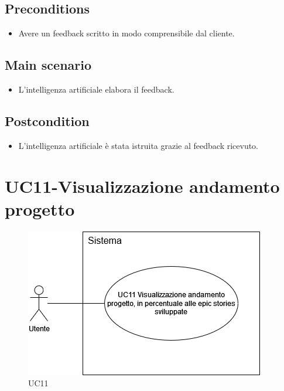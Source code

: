 \documentclass{article}
\begin{document}
     \subsection*{Preconditions} 
        \begin{itemize}
            \item Avere un feedback scritto in modo comprensibile dal cliente.
        \end{itemize}
        \subsection*{Main scenario}
        \begin{itemize}
            \item L'intelligenza artificiale elabora il feedback.
        \end{itemize}
        \subsection*{Postcondition} 
        \begin{itemize}
            \item L'intelligenza artificiale è stata istruita grazie al feedback ricevuto.
        \end{itemize}
        

\section{UC11-Visualizzazione andamento progetto}
    \begin{figure}[h]
      \centering
      \includegraphics[width=.8\textwidth, height=.6\textheight, keepaspectratio]{documenti/imgUML/UC11-VISUALIZZAZIONE-ANDAMENTO-PROGETTO.drawio.png}
        \caption{UC11}
      \label{fig:UC11}
    \end{figure}
    
\end{document}
